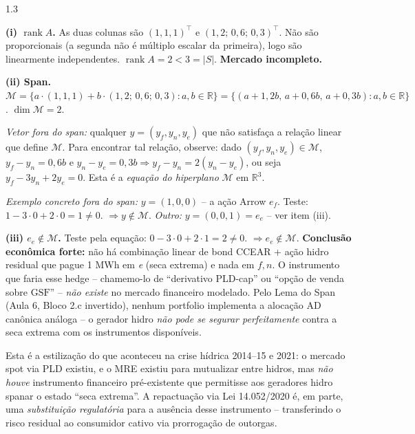 \documentclass[11pt,addpoints]{exam}
\newcommand{\rank}{\operatorname{rank}}
\newcommand{\GSF}{\text{GSF}}
\begin{document}
\begin{spacing}{1.3}
\begin{questions}
\begin{parts}
\begin{solution}
\textbf{(i) $\rank A$.} As duas colunas são $(1, 1, 1)^\top$ e $(1{,}2;\, 0{,}6;\, 0{,}3)^\top$. Não são proporcionais (a segunda não é múltiplo escalar da primeira), logo são linearmente independentes. $\rank A = 2 < 3 = |S|$. \textbf{Mercado incompleto.}

\textbf{(ii) Span.} $\mathcal{M} = \{a\cdot (1,1,1) + b\cdot (1{,}2;\, 0{,}6;\, 0{,}3) : a, b \in \mathbb{R}\} = \{(a + 1{,}2 b,\, a + 0{,}6 b,\, a + 0{,}3 b) : a, b \in \mathbb{R}\}$. $\dim \mathcal{M} = 2$.

\emph{Vetor fora do span:} qualquer $y = (y_f, y_n, y_e)$ que não satisfaça a relação linear que define $\mathcal{M}$. Para encontrar tal relação, observe: dado $(y_f, y_n, y_e) \in \mathcal{M}$, $y_f - y_n = 0{,}6 b$ e $y_n - y_e = 0{,}3 b \Rightarrow y_f - y_n = 2(y_n - y_e)$, ou seja $\boxed{y_f - 3 y_n + 2 y_e = 0.}$ Esta é a \emph{equação do hiperplano} $\mathcal{M}$ em $\mathbb{R}^3$.

\emph{Exemplo concreto fora do span:} $y = (1, 0, 0)$ -- a ação Arrow $e_f$. Teste: $1 - 3\cdot 0 + 2\cdot 0 = 1 \neq 0$. $\Rightarrow y \notin \mathcal{M}$. \emph{Outro:} $y = (0, 0, 1) = e_e$ -- ver item (iii).

\textbf{(iii) $e_e \notin \mathcal{M}$.} Teste pela equação: $0 - 3\cdot 0 + 2\cdot 1 = 2 \neq 0$. $\Rightarrow e_e \notin \mathcal{M}$. \textbf{Conclusão econômica forte:} não há combinação linear de bond CCEAR + ação hidro residual que pague 1 MWh em \emph{e} (seca extrema) e nada em $f, n$. O instrumento que faria esse hedge -- chamemo-lo de ``derivativo PLD-cap'' ou ``opção de venda sobre $\GSF$'' -- \emph{não existe} no mercado financeiro modelado. Pelo Lema do Span (Aula 6, Bloco 2.c invertido), nenhum portfolio implementa a alocação AD canônica análoga -- o gerador hidro \emph{não pode se segurar perfeitamente} contra a seca extrema com os instrumentos disponíveis.

Esta é a estilização do que aconteceu na crise hídrica 2014--15 e 2021: o mercado spot via PLD existiu, e o MRE existiu para mutualizar entre hidros, mas \emph{não houve} instrumento financeiro pré-existente que permitisse aos geradores hidro spanar o estado ``seca extrema''. A repactuação via Lei 14.052/2020 é, em parte, uma \emph{substituição regulatória} para a ausência desse instrumento -- transferindo o risco residual ao consumidor cativo via prorrogação de outorgas.


\end{solution}
\end{parts}
\end{questions}
\end{spacing}
\end{document}
